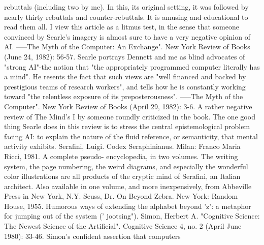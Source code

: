   rebuttals (including two by me). In this, its original setting, it was followed by nearly thirty
  rebuttals and counter-rebuttals. It is amusing and educational to read them all. I view this
  article as a litmus test, in the sense that someone convinced by Searle's imagery is almost
  sure to have a very negative opinion of AI.
-----The Myth of the Computer: An Exchange". New York Review of Books (June 24, 1982):
  56-57. Searle portrays Dennett and me as blind advocates of "strong AI"-the notion that "the
  appropriately programmed computer literally has a mind". He resents the fact that such
  views are "well financed and backed by prestigious teams of research workers", and tells
  how he is constantly working toward "the relentless exposure of its preposterousness".
-----The Myth of the Computer". New York Review of Books (April 29, 1982): 3-6. A rather
  negative review of The Mind's I by someone roundly criticized in the book. The one good
  thing Searle does in this review is to stress the central epistemological problem facing AI: to
  explain the nature of the fluid reference, or semanticity, that mental activity exhibits.
Serafini, Luigi. Codex Seraphinianus. Milan: Franco Maria Ricci, 1981. A complete pseudo-
  encyclopedia, in two volumes. The writing system, the page numbering, the weird
  diagrams, and especially the wonderful color illustrations are all products of the cryptic
  mind of Serafini, an Italian architect. Also available in one volume, and more
  inexpensively, from Abbeville Press in New York, N.Y.
Seuss, Dr. On Beyond Zebra. New York: Random House, 1955. Humorous ways of extending
  the alphabet beyond 'z': a metaphor for jumping out of the system (' jootsing").
Simon, Herbert A. "Cognitive Science: The Newest Science of the Artificial". Cognitive
  Science 4, no. 2 (April June 1980): 33-46. Simon's confident assertion that computers


